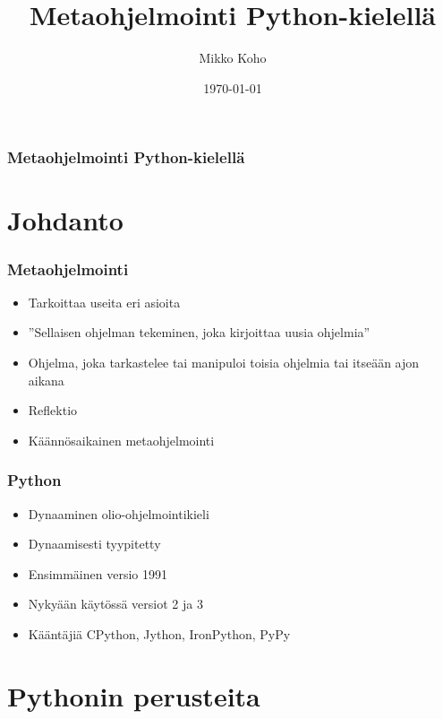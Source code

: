 \documentclass{beamer}
\title{Metaohjelmointi Python-kielellä}
\author{Mikko Koho}
\institute{Helsingin Yliopisto}
\date{\today}
\begin{document}
{
\begin{frame}
\maketitle
\end{frame}
}


\begin{frame}
  \frametitle{Metaohjelmointi Python-kielellä}
  \tableofcontents%
\end{frame}

\section{Johdanto}

\begin{frame}[fragile]
\frametitle{Metaohjelmointi}
\begin{itemize}
\item{Tarkoittaa useita eri asioita}
\item{''Sellaisen ohjelman tekeminen, joka kirjoittaa uusia ohjelmia''}
\item{Ohjelma, joka tarkastelee tai manipuloi toisia ohjelmia tai itseään ajon aikana}
\item{Reflektio}
\item{Käännösaikainen metaohjelmointi}
\end{itemize}
\end{frame}

\begin{frame}[fragile]
\frametitle{Python}
\begin{itemize}
\item{Dynaaminen olio-ohjelmointikieli}
\item{Dynaamisesti tyypitetty}
\item{Ensimmäinen versio 1991}
\item{Nykyään käytössä versiot 2 ja 3}
\item{Kääntäjiä CPython, Jython, IronPython, PyPy}
\end{itemize}
\end{frame}

\section{Pythonin perusteita}
\end{document}

